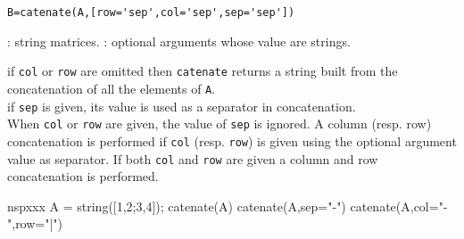 
\begin{mandesc}
\end{mandesc}

\begin{calling_sequence}
\begin{verbatim}
B=catenate(A,[row='sep',col='sep',sep='sep'])
\end{verbatim}
\end{calling_sequence}
\begin{parameters}
  \begin{varlist}
    : string matrices.
    : optional arguments whose value are strings.
  \end{varlist}
\end{parameters}

\begin{mandescription} 
  if \verb+col+ or \verb+row+ are omitted then \verb+catenate+
  returns a string built from the concatenation of all the 
  elements of \verb+A+. \\
  if \verb+sep+ is given, its value 
  is used as a separator in concatenation. \\
  When \verb+col+ or \verb+row+  are given, the value of \verb+sep+
  is ignored. A column (resp. row) concatenation is 
  performed if \verb+col+ (resp. \verb+row+) is given using the optional
  argument value as separator. If both \verb+col+ and \verb+row+ 
  are given a column and row concatenation is performed. 
\end{mandescription}
  
\begin{examples}
  \begin{mintednsp}{nspxxx}
A = string([1,2;3,4]);
    catenate(A)
    catenate(A,sep="-")
    catenate(A,col="-",row="|") 
  \end{mintednsp}
\end{examples}

\begin{manseealso}
\end{manseealso}
